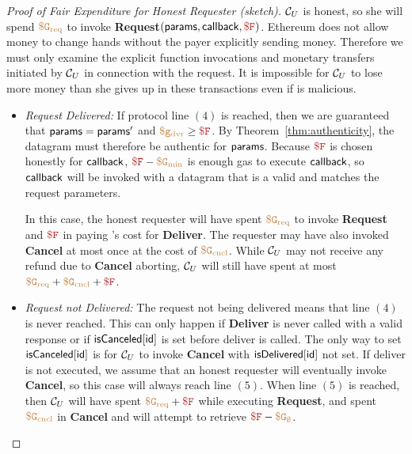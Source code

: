 \begin{proof}[Proof of Fair Expenditure for Honest Requester (sketch)]
${\cal C}_U$ is honest, so she will spend $\tt {\color{brown} \$G_\text{req} }$ to invoke {\bf Request}$(\dgform, \dgcallback, \consthonestfee)$.
Ethereum does not allow money to change hands without the payer explicitly sending money.
Therefore we must only examine the explicit function invocations and monetary transfers initiated by ${\cal C}_U$ in connection with the request.
It is impossible for ${\cal C}_U$ to lose more money than she gives up in these transactions even if \tc is malicious.

\begin{itemize}
\item {\it Request Delivered:}
If protocol line $(4)$ is reached, then we are guaranteed that ${\sf params} = {\sf params}'$ and $\gasdeliver \geq \consthonestfee$.
By Theorem~\ref{thm:authenticity}, the datagram must therefore be authentic for ${\sf params}$.
Because $\consthonestfee$ is chosen honestly for ${\sf callback}$, $\consthonestfee - \constgasmin$ is enough gas to execute ${\sf callback}$,
so ${\sf callback}$ will be invoked with a datagram that is a valid and matches the request parameters.

In this case, the honest requester will have spent $\tt {\color{brown} \$G_\text{req} }$ to invoke {\bf Request} and $\consthonestfee$ in paying \tc's cost for {\bf Deliver}.
The requester may have also invoked {\bf Cancel} at most once at the cost of $\tt {\color{brown} \$G_\text{cncl} }$.
While ${\cal C}_U$ may not receive any refund due to {\bf Cancel} aborting, ${\cal C}_U$ will still have spent at most $\constgasrequest + \constgasinvokecancel + \consthonestfee$.


\item {\it Request not Delivered:}
The request not being delivered means that line $(4)$ is never reached.
This can only happen if {\bf Deliver} is never called with a valid response or if ${\sf isCanceled}[{\sf id}]$ is set before deliver is called.
The only way to set ${\sf isCanceled}[{\sf id}]$ is for ${\cal C}_U$ to invoke {\bf Cancel} with ${\sf isDelivered}[{\sf id}]$ not set.
If deliver is not executed, we assume that an honest requester will eventually invoke {\bf Cancel}, so this case will always reach line $(5)$.
When line $(5)$ is reached, then ${\cal C}_U$ will have spent $\constgasrequest + \consthonestfee$ while executing {\bf Request},
and spent $\tt {\color{brown} \$G_\text{cncl} }$ in {\bf Cancel} and will attempt to retrieve $\consthonestfee - \constgascancel$.


\end{itemize}
\end{proof}
